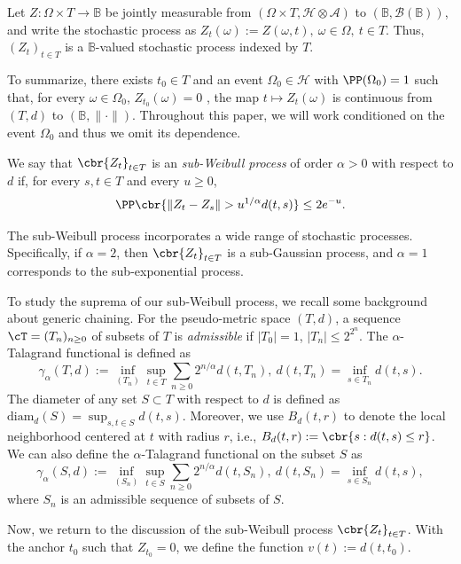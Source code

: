 \documentclass[11pt]{article}
\begin{document}
Let $Z:\Omega\times T\longrightarrow\mathbb B$ be jointly measurable from
$(\Omega\times T,\mathcal H\otimes\mathcal A)$ to
$(\mathbb B,\mathcal B(\mathbb B))$, and write the stochastic process as $Z_t(\omega):=Z(\omega,t),
\ 
\omega\in\Omega,\ t\in T$.
Thus, $(Z_t)_{t\in T}$ is a $\mathbb B$-valued stochastic process
indexed by $T$.



To summarize, there exists $t_0\in T$ and an event
$\Omega_0\in\mathcal H$ with $\PP(\Omega_0)=1$ such that, for every
$\omega\in\Omega_0$, $Z_{t_0}(\omega)=0$
, the map $t\mapsto Z_t(\omega)$ 
is continuous from $(T,d)$ to $(\mathbb B,\|\cdot\|)$. Throughout this paper, we will work conditioned on the event $\Omega_0$ and thus we omit its dependence.

We say that $\cbr{Z_t}_{t\in T}$ is an \emph{sub-Weibull process} of
order $\alpha>0$ with respect to $d$ if, for every $s,t\in T$ and
every $u\ge0$,
\begin{align*}
\PP\cbr{
\|Z_t-Z_s\|>u^{1/\alpha}d(t,s)
}
\le 2e^{-u}.
\end{align*}


The sub-Weibull process incorporates a wide range of stochastic processes. Specifically, if $\alpha=2$, then $\cbr{Z_t}_{t\in T}$ is a sub-Gaussian process, and $\alpha=1$ corresponds to the sub-exponential process.

To study the suprema of our sub-Weibull process, we recall some background about generic chaining.
For the pseudo-metric space $(T,d)$, a sequence $\cT=(T_n)_{n\ge 0}$ of subsets of $T$ is \emph{admissible} if $|T_0|=1$, $|T_n|\le 2^{2^n}$. The $\alpha$-Talagrand functional \citep{dirksen2015tail} is defined as
\[
\gamma_{\alpha}(T,d):=\inf_{(T_n)}\sup_{t\in T}\sum_{n\ge 0}2^{n/\alpha}d(t,T_n),\ d(t,T_n)=\inf_{s\in T_n}d(t,s).
\]
The diameter of any set $S\subset T$ with respect to $d$ is defined as $\text{diam}_d(S)=\sup_{s,t\in S}d(t,s)$. Moreover, we use $B_d(t,r)$ to denote the local neighborhood centered at $t$ with radius $r$, i.e., $B_d(t,r):=\cbr{s:d(t,s)\le r}$. We can also define the $\alpha$-Talagrand functional on the subset $S$ as $$\gamma_{\alpha}(S,d):=\inf_{(S_n)}\sup_{t\in S}\sum_{n\ge 0}2^{n/\alpha}d(t,S_n),\ d(t,S_n)=\inf_{s\in S_n}d(t,s),$$
where $S_n$ is an admissible sequence of subsets of $S$.



Now, we return to the discussion of the sub-Weibull process $\cbr{Z_t}_{t\in T}$. With the anchor $t_0$ such that $Z_{t_0}=0$, we define the function $v(t):=d(t,t_0)$.
\end{document}
